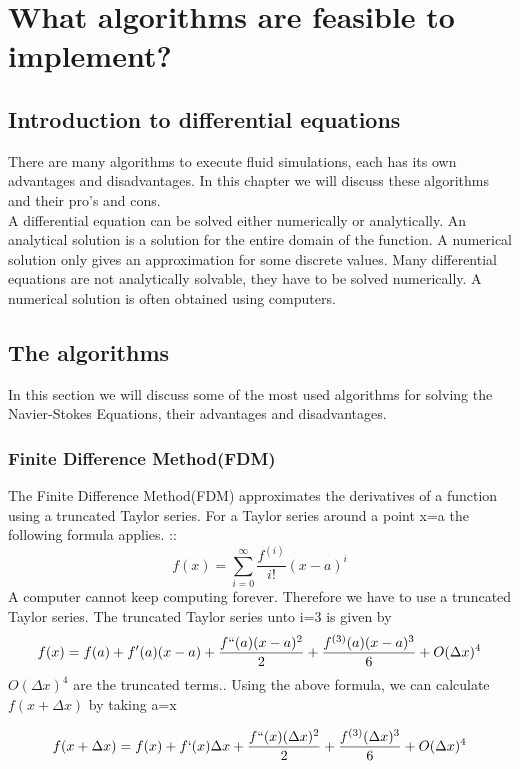 \documentclass{article}
\begin{document}
\newpage
\section{What algorithms are feasible to implement?}
\subsection{Introduction to differential equations}
There are many algorithms to execute fluid simulations, each has its own advantages and disadvantages. In this chapter we will discuss these algorithms and their pro's and cons. 
\\

A differential equation can be solved either numerically or analytically. An analytical solution is a solution for the entire domain of the function. A numerical solution only gives an approximation for some discrete values.  Many differential equations are not analytically solvable, they have to be solved numerically. A numerical solution is often obtained using computers. \cite{What is discretization}




\subsection{The algorithms}
In this section we will discuss some of the most used algorithms for solving the Navier-Stokes Equations, their advantages and disadvantages. 
\subsubsection{Finite Difference Method(FDM)}
The Finite Difference Method(FDM) approximates the derivatives of a function using a truncated Taylor series. For a Taylor series around a point x=a the following formula applies. :\cite{Taylor series}:
\[f(x)=\sum_{i=0}^{\infty}\frac{f^{(i)}}{i!}(x-a)^{i}\]
A computer cannot keep computing forever. Therefore we have to use a truncated Taylor series. The truncated Taylor series unto i=3 is given by \cite{Taylor series approximation}
\[f(x)=f(a)+f'(a)(x-a)+\frac{f``(a)(x-a)^{2}}{2} + \frac{f^{(3)}(a)(x-a)^{3}}{6}+O(\Delta x)^{4}\]
$O(\Delta x) ^{4}$ are the truncated terms.\cite{Big O}. Using the above formula, we can calculate $f(x+\Delta x)$ by taking a=x\cite{quantstart FDM}

\begin{equation}f(x+\Delta x)=f(x)+f`(x)\Delta x + \frac{f``(x) (\Delta x)^{2}}{2}+ \frac{f^{(3)} (\Delta x)^{3}}{6} + O(\Delta x)^{4}\label{eqn:x plus deltax}\end{equation}
\end{document}
